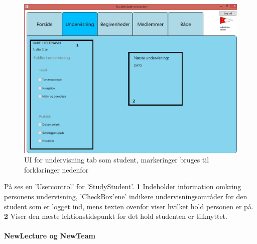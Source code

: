 \begin{figure}[htbp]
  \centering
  \includegraphics[width=1\textwidth]{images/UI/StudyStudentMarked.jpg}
  \caption[UIStudyStudent]{UI for undervisning tab som student, markeringer bruges til forklaringer nedenfor}
  \label{fig:StudyStudent}
\end{figure}

På  ses en 'Usercontrol' for 'StudyStudent'. \textbf{1} Indeholder information omkring personens undervisning, 'CheckBox'ene' indikere undervisningsområder for den student som er logget ind, mens texten ovenfor viser hvilket hold personen er på. \textbf{2} Viser den næste lektionstidspunkt for det hold studenten er tilknyttet.

\paragraph{NewLecture og NewTeam}

